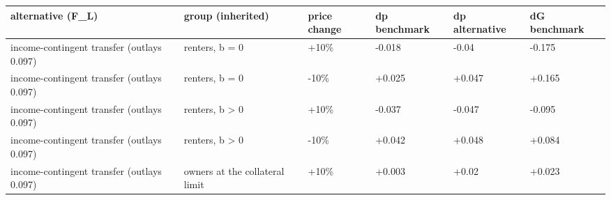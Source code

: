 \begingroup\small
\setlength{\tabcolsep}{3pt}
\renewcommand{\arraystretch}{1.04}
\begin{tabularx}{\linewidth}{XXXXXX}
\toprule
alternative (F\_L) & group (inherited) & price change & dp benchmark & dp alternative & dG benchmark \\
\midrule
income-contingent transfer (outlays 0.097) & renters, b = 0 & +10\% & -0.018 & -0.04 & -0.175 \\
income-contingent transfer (outlays 0.097) & renters, b = 0 & -10\% & +0.025 & +0.047 & +0.165 \\
income-contingent transfer (outlays 0.097) & renters, b \textgreater{} 0 & +10\% & -0.037 & -0.047 & -0.095 \\
income-contingent transfer (outlays 0.097) & renters, b \textgreater{} 0 & -10\% & +0.042 & +0.048 & +0.084 \\
income-contingent transfer (outlays 0.097) & owners at the collateral limit & +10\% & +0.003 & +0.02 & +0.023 \\
\bottomrule
\end{tabularx}
\endgroup
